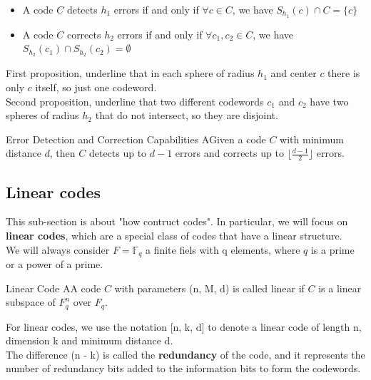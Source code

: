 \noindent
\begin{propBox}{}{}
    \begin{itemize}
        \item A code $C$ detects $h_1$ errors if and only if $\forall c \in C$, we have $S_{h_1}(c) \cap C = \{c\}$
        \item A code $C$ corrects $h_2$ errors if and only if $\forall c_1, c_2 \in C$,  we have $S_{h_2}(c_1) \cap S_{h_2}(c_2) = \emptyset$
    \end{itemize}
\end{propBox}

\noindent
First proposition, underline that in each sphere of radius $h_1$ and center $c$ there is only $c$ itself, so just one codeword.\\
Second proposition, underline that two different codewords $c_1$ and $c_2$ have two spheres of radius $h_2$ that do not intersect, so they are disjoint.
\vspace{1 cm}

\noindent
\begin{thmBox}{Error Detection and Correction Capabilities}
    AGiven a code $C$ with minimum distance $d$, then $C$ detects up to $d-1$ errors and corrects up to $\lfloor \frac{d-1}{2} \rfloor$ errors.
    \label{thm:error-detect-correct}
\end{thmBox}



\subsection{Linear codes}
This sub-section is about "how contruct codes". In particular, we will focus on \textbf{linear codes}, which are a special class of codes that have a linear structure.\\
We will always consider $F = \mathbb{F}_q$ a finite fiels with q elements, where $q$ is a prime or a power of a prime.
\medskip

\begin{defBox}{Linear Code}
    AA code $C$ with parameters (n, M, d) is called linear if $C$ is a linear subspace of $F^n_q$ over $F_q$.
\end{defBox} 

\noindent
For linear codes, we use the notation [n, k, d] to denote a linear code of length n, dimension k and minimum distance d.\\
The difference (n - k) is called the \textbf{redundancy} of the code, and it represents the number of redundancy bits added to the information bits to form the codewords.
\bigskip

